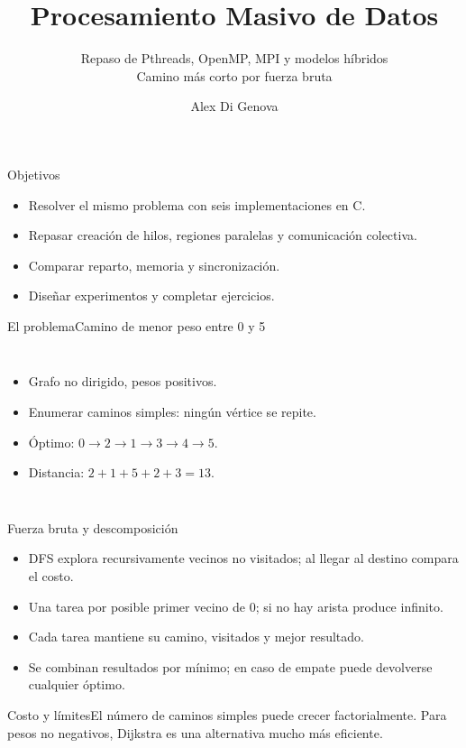 \documentclass[handout,aspectratio=169,10pt]{beamer}
\title{Procesamiento Masivo de Datos}
\subtitle{Repaso de Pthreads, OpenMP, MPI y modelos híbridos\\Camino más corto por fuerza bruta}
\author{Alex Di Genova}
\institute{Universidad de O'Higgins}
\date{}
\begin{document}
\begin{frame}\titlepage\end{frame}
\begin{frame}{Objetivos}
\begin{itemize}[<+->]\item Resolver el mismo problema con seis implementaciones en C.\item Repasar creación de hilos, regiones paralelas y comunicación colectiva.\item Comparar reparto, memoria y sincronización.\item Diseñar experimentos y completar ejercicios.\end{itemize}
\end{frame}
\begin{frame}{El problema}{Camino de menor peso entre 0 y 5}
\begin{columns}[T]\centering
{}
\begin{itemize}[<+->]\item Grafo no dirigido, pesos positivos.\item Enumerar caminos simples: ningún vértice se repite.\item Óptimo: $0\to2\to1\to3\to4\to5$.\item Distancia: $2+1+5+2+3=13$.\end{itemize}\end{columns}
\end{frame}
\begin{frame}{Fuerza bruta y descomposición}
\begin{itemize}[<+->]\item DFS explora recursivamente vecinos no visitados; al llegar al destino compara el costo.\item Una tarea por posible primer vecino de 0; si no hay arista produce infinito.\item Cada tarea mantiene su camino, visitados y mejor resultado.\item Se combinan resultados por mínimo; en caso de empate puede devolverse cualquier óptimo.\end{itemize}
\begin{block}{Costo y límites}El número de caminos simples puede crecer factorialmente. Para pesos no negativos, Dijkstra es una alternativa mucho más eficiente.\end{block}
\end{frame}
\end{document}
